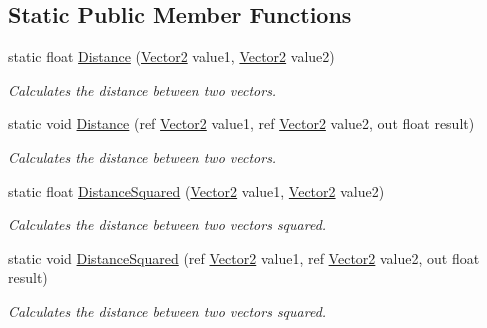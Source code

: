 \subsection*{Static Public Member Functions}
\begin{DoxyCompactItemize}
\item 
static float \hyperlink{struct_microsoft_1_1_xna_1_1_framework_1_1_vector2_ada46dcc9bd1a3d57e72f07fbfee0eef4}{Distance} (\hyperlink{struct_microsoft_1_1_xna_1_1_framework_1_1_vector2}{Vector2} value1, \hyperlink{struct_microsoft_1_1_xna_1_1_framework_1_1_vector2}{Vector2} value2)
\begin{DoxyCompactList}\small\item\em Calculates the distance between two vectors.\end{DoxyCompactList}\item 
static void \hyperlink{struct_microsoft_1_1_xna_1_1_framework_1_1_vector2_ab39d1402386de6276a677eea335eb70a}{Distance} (ref \hyperlink{struct_microsoft_1_1_xna_1_1_framework_1_1_vector2}{Vector2} value1, ref \hyperlink{struct_microsoft_1_1_xna_1_1_framework_1_1_vector2}{Vector2} value2, out float result)
\begin{DoxyCompactList}\small\item\em Calculates the distance between two vectors.\end{DoxyCompactList}\item 
static float \hyperlink{struct_microsoft_1_1_xna_1_1_framework_1_1_vector2_ad38d673a8138fb36f9eef89e5378f94d}{Distance\+Squared} (\hyperlink{struct_microsoft_1_1_xna_1_1_framework_1_1_vector2}{Vector2} value1, \hyperlink{struct_microsoft_1_1_xna_1_1_framework_1_1_vector2}{Vector2} value2)
\begin{DoxyCompactList}\small\item\em Calculates the distance between two vectors squared.\end{DoxyCompactList}\item 
static void \hyperlink{struct_microsoft_1_1_xna_1_1_framework_1_1_vector2_a3408fa30bbc1e6aaeed88481858915bd}{Distance\+Squared} (ref \hyperlink{struct_microsoft_1_1_xna_1_1_framework_1_1_vector2}{Vector2} value1, ref \hyperlink{struct_microsoft_1_1_xna_1_1_framework_1_1_vector2}{Vector2} value2, out float result)
\begin{DoxyCompactList}\small\item\em Calculates the distance between two vectors squared.\end{DoxyCompactList}\item 

\end{DoxyCompactItemize}

